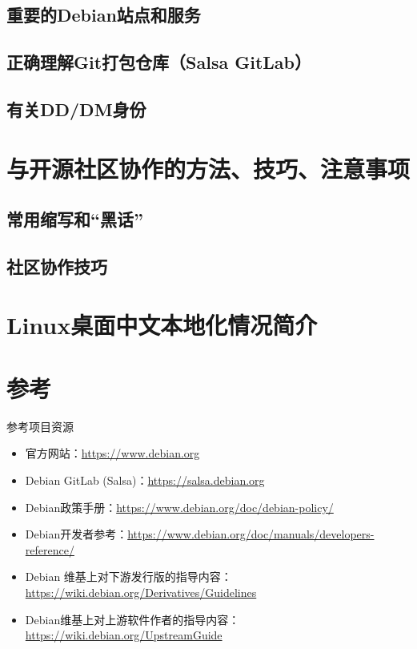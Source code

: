 \documentclass[aspectratio=169]{beamer}
\begin{document}


\subsection{重要的Debian站点和服务}



\subsection{正确理解Git打包仓库（Salsa GitLab）}



\subsection{有关DD/DM身份}


\section{与开源社区协作的方法、技巧、注意事项}

\subsection{常用缩写和“黑话”}


\subsection{社区协作技巧}


\section{Linux桌面中文本地化情况简介}



\section*{参考}
\begin{frame}[t]{参考}{项目资源}
\begin{itemize}
\item 官方网站：\url{https://www.debian.org}
\item Debian GitLab (Salsa)：\url{https://salsa.debian.org}
\item Debian政策手册：\url{https://www.debian.org/doc/debian-policy/}
\item Debian开发者参考：\url{https://www.debian.org/doc/manuals/developers-reference/}
\item Debian 维基上对下游发行版的指导内容：\url{https://wiki.debian.org/Derivatives/Guidelines}
\item Debian维基上对上游软件作者的指导内容：\url{https://wiki.debian.org/UpstreamGuide}
\end{itemize}
\end{frame}
\end{document}
